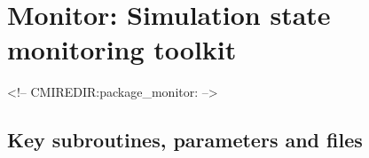 \section{Monitor: Simulation state monitoring toolkit}
\label{sec:pkg:monitor}
\begin{rawhtml}
<!-- CMIREDIR:package_monitor: -->
\end{rawhtml}

\subsection{Key subroutines, parameters and files}
\label{sec:pkg:monitor:implementation_synopsis}
